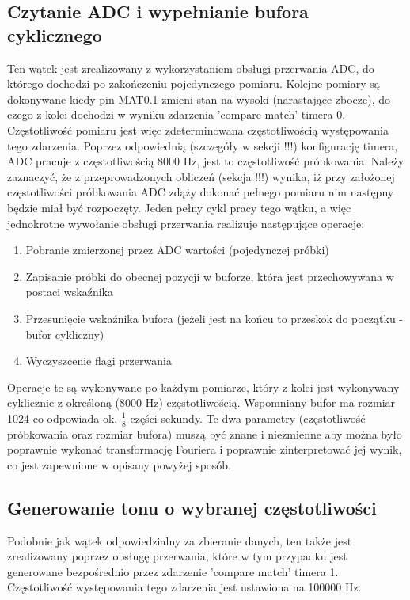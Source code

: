 \subsection{Czytanie ADC i wypełnianie bufora cyklicznego} \label{zasada_dzialania_watek_adc}
Ten wątek jest zrealizowany z wykorzystaniem obsługi przerwania ADC, do którego dochodzi po zakończeniu pojedynczego pomiaru. Kolejne pomiary są dokonywane kiedy pin MAT0.1 zmieni stan na wysoki (narastające zbocze), do czego z kolei dochodzi w wyniku zdarzenia 'compare match' timera 0. Częstotliwość pomiaru jest więc zdeterminowana częstotliwością występowania tego zdarzenia. Poprzez odpowiednią (szczegóły w sekcji !!!) konfigurację timera, ADC pracuje z częstotliwością 8000 Hz, jest to częstotliwość próbkowania. Należy zaznaczyć, że z przeprowadzonych obliczeń (sekcja !!!) wynika, iż przy założonej częstotliwości próbkowania ADC zdąży dokonać pełnego pomiaru nim następny będzie miał być rozpoczęty. Jeden pełny cykl pracy tego wątku, a więc jednokrotne wywołanie obsługi przerwania realizuje następujące operacje:
\begin{enumerate}
    \item Pobranie zmierzonej przez ADC wartości (pojedynczej próbki)
    \item Zapisanie próbki do obecnej pozycji w buforze, która jest przechowywana w postaci wskaźnika
    \item Przesunięcie wskaźnika bufora (jeżeli jest na końcu to przeskok do początku - bufor cykliczny)
    \item Wyczyszcenie flagi przerwania
\end{enumerate}
Operacje te są wykonywane po każdym pomiarze, który z kolei jest wykonywany cyklicznie z określoną (8000 Hz) częstotliwością. Wspomniany bufor ma rozmiar 1024 co odpowiada ok. $\frac{1}{8}$ części sekundy. Te dwa parametry (częstotliwość próbkowania oraz rozmiar bufora) muszą być znane i niezmienne aby można było poprawnie wykonać transformację Fouriera i poprawnie zinterpretować jej wynik, co jest zapewnione w opisany powyżej sposób.

\subsection{Generowanie tonu o wybranej częstotliwości} \label{zasada_dzialania_watek_dac}
Podobnie jak wątek odpowiedzialny za zbieranie danych, ten także jest zrealizowany poprzez obsługę przerwania, które w tym przypadku jest generowane bezpośrednio przez zdarzenie 'compare match' timera 1. Częstotliwość występowania tego zdarzenia jest ustawiona na 100000 Hz.

